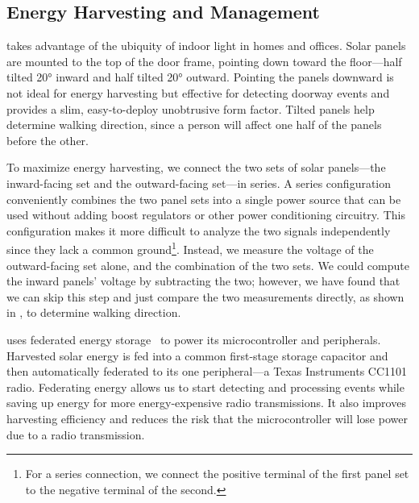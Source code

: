 \subsection{Energy Harvesting and Management}
\sysname takes advantage of the ubiquity of indoor light in homes and offices.
Solar panels are mounted to the top of the door frame, pointing down toward the floor---half tilted \ang{20} inward and half tilted \ang{20} outward.
Pointing the panels downward is not ideal for energy harvesting but effective for detecting doorway events and provides a slim, easy-to-deploy unobtrusive form factor.
Tilted panels help \sysname determine walking direction, since a person will affect one half of the panels before the other. 

To maximize energy harvesting, we connect the two sets of solar panels---the inward-facing set and the outward-facing set---in series.  
A series configuration conveniently combines the two panel sets into a single power source that can be used without adding boost regulators or other power conditioning circuitry.
This configuration makes it more difficult to analyze the two signals independently since they lack a common ground\footnote{For a series connection, we connect the positive terminal of the first panel set to the negative terminal of the second.}.
Instead, we measure the voltage of the outward-facing set alone, and the combination of the two sets.
We could compute the inward panels' voltage by subtracting the two; however, we have found that we can skip this step and just compare the two measurements directly, as shown in , to determine walking direction.


\sysname uses federated energy storage~\cite{jhester:ufop:sensys} to power its microcontroller and peripherals.
Harvested solar energy is fed into a common first-stage storage capacitor and then automatically federated to its one peripheral---a Texas Instruments CC1101 radio.
Federating energy allows us to start detecting and processing events while saving up energy for more energy-expensive radio transmissions.
It also improves harvesting efficiency and reduces the risk that the microcontroller will lose power due to a radio transmission.

